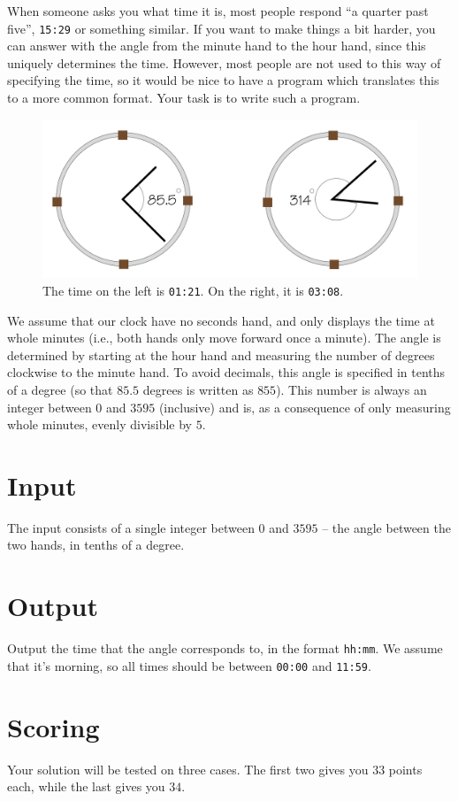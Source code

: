 When someone asks you what time it is, most people respond ``a quarter past five'', \texttt{15:29} or something similar.
If you want to make things a bit harder, you can answer with the angle from the minute hand to the hour hand, since this uniquely determines the time.
However, most people are not used to this way of specifying the time, so it would be nice to have a program which translates this to a more common format.
Your task is to write such a program.

\begin{figure}[h]
\includegraphics[width=\textwidth]{fig.png}
    \caption{The time on the left is \texttt{01:21}. On the right, it is \texttt{03:08}.}
\end{figure}

We assume that our clock have no seconds hand, and only displays the time at whole minutes (i.e., both hands only move forward once a minute).
The angle is determined by starting at the hour hand and measuring the number of degrees clockwise to the minute hand.
To avoid decimals, this angle is specified in tenths of a degree (so that $85.5$ degrees is written as $855$).
This number is always an integer between $0$ and $3595$ (inclusive) and is, as a consequence of only measuring whole minutes, evenly divisible by $5$.

\section*{Input}
The input consists of a single integer between $0$ and $3595$ -- the angle between the two hands, in tenths of a degree. 

\section*{Output}
Output the time that the angle corresponds to, in the format \texttt{hh:mm}.
We assume that it's morning, so all times should be between \texttt{00:00} and \texttt{11:59}.

\section*{Scoring}
Your solution will be tested on three cases.
The first two gives you $33$ points each, while the last gives you $34$.
